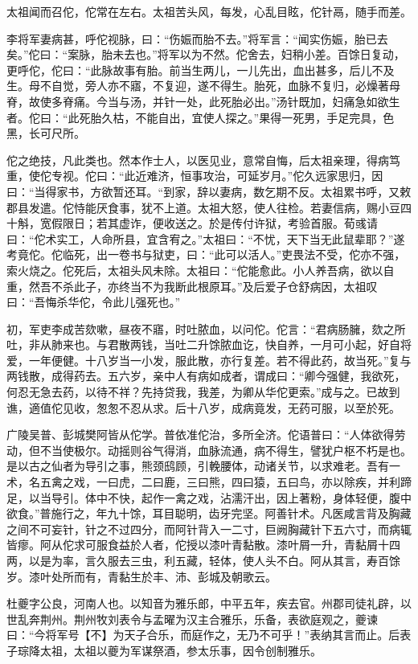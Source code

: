 \documentclass[12pt,UTF8]{ctexbook}
\begin{document}
太祖闻而召佗，佗常在左右。太祖苦头风，每发，心乱目眩，佗针鬲，随手而差。

李将军妻病甚，呼佗视脉，曰：“伤娠而胎不去。”将军言：“闻实伤娠，胎已去矣。”佗曰：“案脉，胎未去也。”将军以为不然。佗舍去，妇稍小差。百馀日复动，更呼佗，佗曰：“此脉故事有胎。前当生两儿，一儿先出，血出甚多，后儿不及生。母不自觉，旁人亦不寤，不复迎，遂不得生。胎死，血脉不复归，必燥著母脊，故使多脊痛。今当与汤，并针一处，此死胎必出。”汤针既加，妇痛急如欲生者。佗曰：“此死胎久枯，不能自出，宜使人探之。”果得一死男，手足完具，色黑，长可尺所。

佗之绝技，凡此类也。然本作士人，以医见业，意常自悔，后太祖亲理，得病笃重，使佗专视。佗曰：“此近难济，恒事攻治，可延岁月。”佗久远家思归，因曰：“当得家书，方欲暂还耳。“到家，辞以妻病，数乞期不反。太祖累书呼，又敕郡县发遣。佗恃能厌食事，犹不上道。太祖大怒，使人往检。若妻信病，赐小豆四十斛，宽假限日；若其虚诈，便收送之。於是传付许狱，考验首服。荀彧请曰：“佗术实工，人命所县，宜含宥之。”太祖曰：“不忧，天下当无此鼠辈耶？”遂考竟佗。佗临死，出一卷书与狱吏，曰：“此可以活人。”吏畏法不受，佗亦不强，索火烧之。佗死后，太祖头风未除。太祖曰：“佗能愈此。小人养吾病，欲以自重，然吾不杀此子，亦终当不为我断此根原耳。”及后爱子仓舒病因，太祖叹曰：“吾悔杀华佗，令此儿强死也。”

初，军吏李成苦欬嗽，昼夜不寤，时吐脓血，以问佗。佗言：“君病肠臃，欬之所吐，非从肺来也。与君散两钱，当吐二升馀脓血讫，快自养，一月可小起，好自将爱，一年便健。十八岁当一小发，服此散，亦行复差。若不得此药，故当死。”复与两钱散，成得药去。五六岁，亲中人有病如成者，谓成曰：“卿今强健，我欲死，何忍无急去药，以待不祥？先持贷我，我差，为卿从华佗更索。”成与之。已故到谯，適值佗见收，怱怱不忍从求。后十八岁，成病竟发，无药可服，以至於死。

广陵吴普、彭城樊阿皆从佗学。普依准佗治，多所全济。佗语普曰：“人体欲得劳动，但不当使极尔。动摇则谷气得消，血脉流通，病不得生，譬犹户枢不朽是也。是以古之仙者为导引之事，熊颈鸱顾，引輓腰体，动诸关节，以求难老。吾有一术，名五禽之戏，一曰虎，二曰鹿，三曰熊，四曰猿，五曰鸟，亦以除疾，并利蹄足，以当导引。体中不快，起作一禽之戏，沾濡汗出，因上著粉，身体轻便，腹中欲食。”普施行之，年九十馀，耳目聪明，齿牙完坚。阿善针术。凡医咸言背及胸藏之间不可妄针，针之不过四分，而阿针背入一二寸，巨阙胸藏针下五六寸，而病辄皆瘳。阿从佗求可服食益於人者，佗授以漆叶青黏散。漆叶屑一升，青黏屑十四两，以是为率，言久服去三虫，利五藏，轻体，使人头不白。阿从其言，寿百馀岁。漆叶处所而有，青黏生於丰、沛、彭城及朝歌云。

杜夔字公良，河南人也。以知音为雅乐郎，中平五年，疾去官。州郡司徒礼辟，以世乱奔荆州。荆州牧刘表令与孟曜为汉主合雅乐，乐备，表欲庭观之，夔谏曰：“今将军号【不】为天子合乐，而庭作之，无乃不可乎！”表纳其言而止。后表子琮降太祖，太祖以夔为军谋祭酒，参太乐事，因令创制雅乐。
\end{document}
